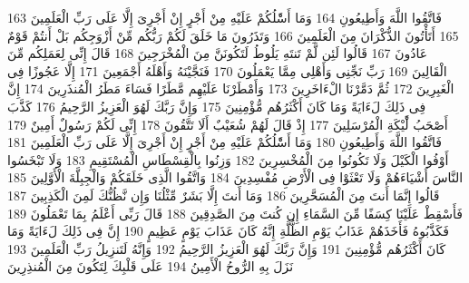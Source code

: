 \documentclass[20pt,a4paper]{article}
\begin{document}
{\tiny\colorbox{cl_aya}{163}} فَاتَّقُوا اللَّهَ وَأَطِيعُونِ
{\tiny\colorbox{cl_aya}{164}} وَمَا أَسَْٔلُكُمْ عَلَيْهِ مِنْ أَجْرٍ إِنْ أَجْرِىَ إِلَّا عَلَى رَبِّ الْعَلَمِينَ
{\tiny\colorbox{cl_aya}{165}} أَتَأْتُونَ الذُّكْرَانَ مِنَ الْعَلَمِينَ
{\tiny\colorbox{cl_aya}{166}} وَتَذَرُونَ مَا خَلَقَ لَكُمْ رَبُّكُم مِّنْ أَزْوَجِكُم بَلْ أَنتُمْ قَوْمٌ عَادُونَ
{\tiny\colorbox{cl_aya}{167}} قَالُوا لَئِن لَّمْ تَنتَهِ يَلُوطُ لَتَكُونَنَّ مِنَ الْمُخْرَجِينَ
{\tiny\colorbox{cl_aya}{168}} قَالَ إِنِّى لِعَمَلِكُم مِّنَ الْقَالِينَ
{\tiny\colorbox{cl_aya}{169}} رَبِّ نَجِّنِى وَأَهْلِى مِمَّا يَعْمَلُونَ
{\tiny\colorbox{cl_aya}{170}} فَنَجَّيْنَهُ وَأَهْلَهُ أَجْمَعِينَ
{\tiny\colorbox{cl_aya}{171}} إِلَّا عَجُوزًا فِى الْغَبِرِينَ
{\tiny\colorbox{cl_aya}{172}} ثُمَّ دَمَّرْنَا الْءَاخَرِينَ
{\tiny\colorbox{cl_aya}{173}} وَأَمْطَرْنَا عَلَيْهِم مَّطَرًا فَسَاءَ مَطَرُ الْمُنذَرِينَ
{\tiny\colorbox{cl_aya}{174}} إِنَّ فِى ذَلِكَ لَءَايَةً وَمَا كَانَ أَكْثَرُهُم مُّؤْمِنِينَ
{\tiny\colorbox{cl_aya}{175}} وَإِنَّ رَبَّكَ لَهُوَ الْعَزِيزُ الرَّحِيمُ
{\tiny\colorbox{cl_aya}{176}} كَذَّبَ أَصْحَبُ لَْٔيْكَةِ الْمُرْسَلِينَ
{\tiny\colorbox{cl_aya}{177}} إِذْ قَالَ لَهُمْ شُعَيْبٌ أَلَا تَتَّقُونَ
{\tiny\colorbox{cl_aya}{178}} إِنِّى لَكُمْ رَسُولٌ أَمِينٌ
{\tiny\colorbox{cl_aya}{179}} فَاتَّقُوا اللَّهَ وَأَطِيعُونِ
{\tiny\colorbox{cl_aya}{180}} وَمَا أَسَْٔلُكُمْ عَلَيْهِ مِنْ أَجْرٍ إِنْ أَجْرِىَ إِلَّا عَلَى رَبِّ الْعَلَمِينَ
{\tiny\colorbox{cl_aya}{181}} أَوْفُوا الْكَيْلَ وَلَا تَكُونُوا مِنَ الْمُخْسِرِينَ
{\tiny\colorbox{cl_aya}{182}} وَزِنُوا بِالْقِسْطَاسِ الْمُسْتَقِيمِ
{\tiny\colorbox{cl_aya}{183}} وَلَا تَبْخَسُوا النَّاسَ أَشْيَاءَهُمْ وَلَا تَعْثَوْا فِى الْأَرْضِ مُفْسِدِينَ
{\tiny\colorbox{cl_aya}{184}} وَاتَّقُوا الَّذِى خَلَقَكُمْ وَالْجِبِلَّةَ الْأَوَّلِينَ
{\tiny\colorbox{cl_aya}{185}} قَالُوا إِنَّمَا أَنتَ مِنَ الْمُسَحَّرِينَ
{\tiny\colorbox{cl_aya}{186}} وَمَا أَنتَ إِلَّا بَشَرٌ مِّثْلُنَا وَإِن نَّظُنُّكَ لَمِنَ الْكَذِبِينَ
{\tiny\colorbox{cl_aya}{187}} فَأَسْقِطْ عَلَيْنَا كِسَفًا مِّنَ السَّمَاءِ إِن كُنتَ مِنَ الصَّدِقِينَ
{\tiny\colorbox{cl_aya}{188}} قَالَ رَبِّى أَعْلَمُ بِمَا تَعْمَلُونَ
{\tiny\colorbox{cl_aya}{189}} فَكَذَّبُوهُ فَأَخَذَهُمْ عَذَابُ يَوْمِ الظُّلَّةِ إِنَّهُ كَانَ عَذَابَ يَوْمٍ عَظِيمٍ
{\tiny\colorbox{cl_aya}{190}} إِنَّ فِى ذَلِكَ لَءَايَةً وَمَا كَانَ أَكْثَرُهُم مُّؤْمِنِينَ
{\tiny\colorbox{cl_aya}{191}} وَإِنَّ رَبَّكَ لَهُوَ الْعَزِيزُ الرَّحِيمُ
{\tiny\colorbox{cl_aya}{192}} وَإِنَّهُ لَتَنزِيلُ رَبِّ الْعَلَمِينَ
{\tiny\colorbox{cl_aya}{193}} نَزَلَ بِهِ الرُّوحُ الْأَمِينُ
{\tiny\colorbox{cl_aya}{194}} عَلَى قَلْبِكَ لِتَكُونَ مِنَ الْمُنذِرِينَ
\end{document}
